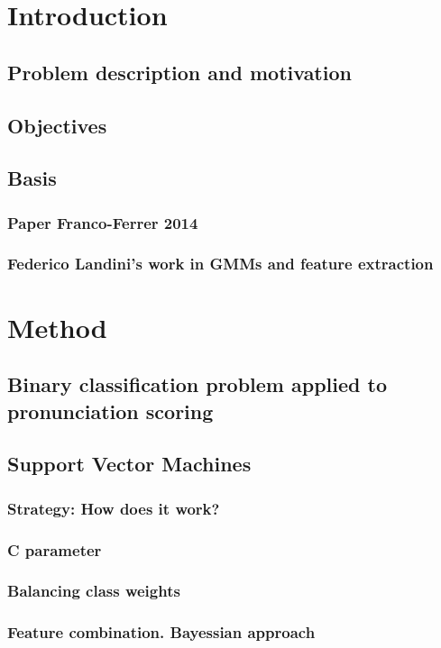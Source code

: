 \documentclass[11pt,a4paper]{tesis}
\begin{document}
\tableofcontents
\chapter{Introduction}
	\section{Problem description and motivation}
	\section{Objectives}
	\section{Basis}
		\subsection{Paper Franco-Ferrer 2014}
		\subsection{Federico Landini's work in GMMs and feature extraction}
\chapter{Method}
	\section{Binary classification problem applied to pronunciation scoring}
	\section{Support Vector Machines}
		\subsection{Strategy: How does it work?}
		\subsection{C parameter}
		\subsection{Balancing class weights}
		\subsection{Feature combination. Bayessian approach}
\end{document}
